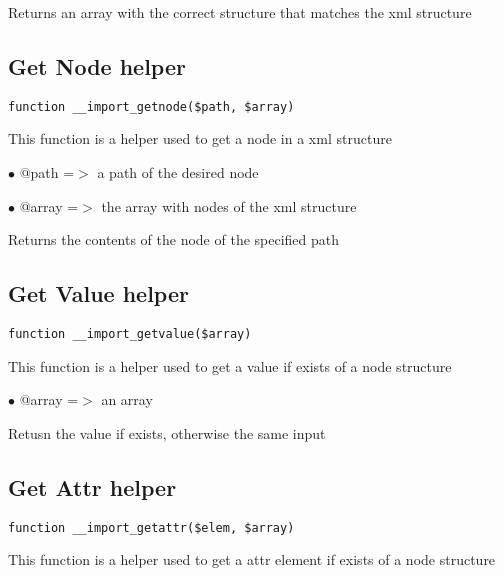 \documentclass[a4paper]{book}
\begin{document}
Returns an array with the correct structure that matches the xml structure

\hypertarget{toc146}{}
\subsection{Get Node helper}

\begin{lstlisting}
function __import_getnode($path, $array)
\end{lstlisting}

This function is a helper used to get a node in a xml structure

\begin{compactitem}
\item[\color{myblue}$\bullet$] @path  =$>$ a path of the desired node
\item[\color{myblue}$\bullet$] @array =$>$ the array with nodes of the xml structure
\end{compactitem}

Returns the contents of the node of the specified path

\hypertarget{toc147}{}
\subsection{Get Value helper}

\begin{lstlisting}
function __import_getvalue($array)
\end{lstlisting}

This function is a helper used to get a value if exists of a node structure

\begin{compactitem}
\item[\color{myblue}$\bullet$] @array =$>$ an array
\end{compactitem}

Retusn the value if exists, otherwise the same input

\hypertarget{toc148}{}
\subsection{Get Attr helper}

\begin{lstlisting}
function __import_getattr($elem, $array)
\end{lstlisting}

This function is a helper used to get a attr element if exists of a node structure
\end{document}
